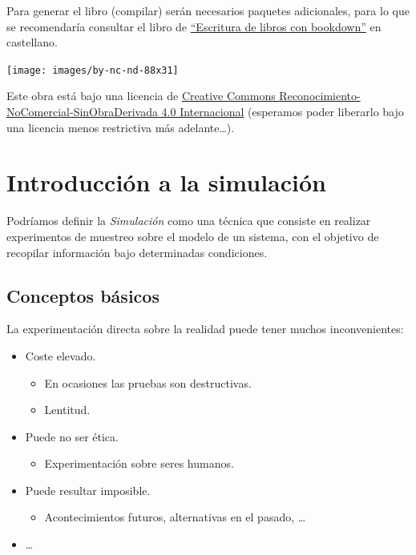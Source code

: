 \documentclass[
]{book}
\providecommand{\tightlist}{%
  \setlength{\itemsep}{0pt}\setlength{\parskip}{0pt}}
\theoremstyle{break}
\theoremstyle{definition}
\theoremstyle{definition}
\theoremstyle{definition}
\theoremstyle{remark}
\begin{document}
Para generar el libro (compilar) serán necesarios paquetes adicionales,
para lo que se recomendaría consultar el libro de \href{https://rubenfcasal.github.io/bookdown_intro}{``Escritura de libros con bookdown''} en castellano.

\texttt{[image: images/by-nc-nd-88x31]}

Este obra está bajo una licencia de \href{https://creativecommons.org/licenses/by-nc-nd/4.0/deed.es_ES}{Creative Commons Reconocimiento-NoComercial-SinObraDerivada 4.0 Internacional}
(esperamos poder liberarlo bajo una licencia menos restrictiva más adelante\ldots).

\hypertarget{cap1}{%
\chapter{Introducción a la simulación}\label{cap1}}

Podríamos definir la \emph{Simulación} como una técnica que consiste en realizar experimentos de muestreo sobre el modelo de un sistema, con el objetivo de recopilar información bajo determinadas condiciones.

\hypertarget{conceptos-buxe1sicos}{%
\section{Conceptos básicos}\label{conceptos-buxe1sicos}}

La experimentación directa sobre la realidad puede tener muchos inconvenientes:

\begin{itemize}
\item
  Coste elevado.

  \begin{itemize}
  \item
    En ocasiones las pruebas son destructivas.
  \item
    Lentitud.
  \end{itemize}
\item
  Puede no ser ética.

  \begin{itemize}
  \tightlist
  \item
    Experimentación sobre seres humanos.
  \end{itemize}
\item
  Puede resultar imposible.

  \begin{itemize}
  \tightlist
  \item
    Acontecimientos futuros, alternativas en el pasado, \ldots{}
  \end{itemize}
\item
  \ldots{}
\end{itemize}
\end{document}
